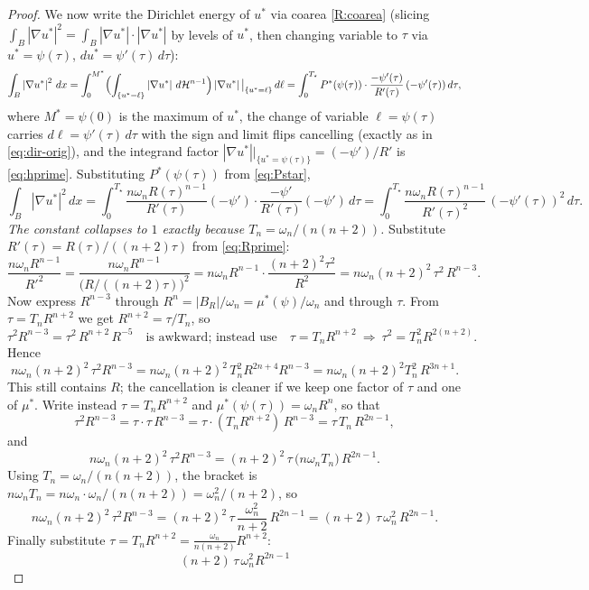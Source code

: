 \documentclass[11pt]{amsart}
\theoremstyle{definition}
\newcommand{\abs}[1]{\left|#1\right|}
\newcommand{\dx}{\,dx}
\newcommand{\dH}{\,d\mathcal H^{n-1}}
\begin{document}
\begin{proof}
We now write the Dirichlet energy of $u^*$ via coarea
\ref{R:coarea} (slicing $\int_B\abs{\nabla u^*}^2=\int_B\abs{\nabla u^*}\cdot
\abs{\nabla u^*}$ by levels of $u^*$, then changing variable to $\tau$ via
$u^*=\psi(\tau)$, $du^*=\psi'(\tau)\,d\tau$):
\[
  \int_B\abs{\nabla u^*}^2\dx
  =\int_0^{M^*}\Bigl(\int_{\{u^*=\ell\}}\abs{\nabla u^*}\dH\Bigr)
     \abs{\nabla u^*}\big|_{\{u^*=\ell\}}\,d\ell
  =\int_0^{T_\star}P^*(\psi(\tau))\cdot\frac{-\psi'(\tau)}{R'(\tau)}
     \,(-\psi'(\tau))\,d\tau,
\]
where $M^*=\psi(0)$ is the maximum of $u^*$, the change of variable
$\ell=\psi(\tau)$ carries $d\ell=\psi'(\tau)\,d\tau$ with the sign and limit
flips cancelling (exactly as in \eqref{eq:dir-orig}), and the integrand
factor $\abs{\nabla u^*}|_{\{u^*=\psi(\tau)\}}=(-\psi')/R'$ is
\eqref{eq:hprime}. Substituting $P^*(\psi(\tau))$ from \eqref{eq:Pstar},
\[
  \int_B\abs{\nabla u^*}^2\dx
  =\int_0^{T_\star}\frac{n\omega_n R(\tau)^{n-1}}{R'(\tau)}(-\psi')
     \cdot\frac{-\psi'}{R'(\tau)}(-\psi')\,d\tau
  =\int_0^{T_\star}\frac{n\omega_n R(\tau)^{n-1}}{R'(\tau)^2}\,
     (-\psi'(\tau))^2\,d\tau .
\]
\emph{The constant collapses to $1$ exactly because $T_n=\omega_n/(n(n+2))$.}
Substitute $R'(\tau)=R(\tau)/((n+2)\tau)$ from \eqref{eq:Rprime}:
\[
  \frac{n\omega_n R^{n-1}}{R'^2}
  =\frac{n\omega_n R^{n-1}}{\bigl(R/((n+2)\tau)\bigr)^2}
  =n\omega_n R^{n-1}\cdot\frac{(n+2)^2\tau^2}{R^2}
  =n\omega_n (n+2)^2\,\tau^2\,R^{n-3}.
\]
Now express $R^{n-3}$ through $R^n=\abs{B_R}/\omega_n=\mu^*(\psi)/\omega_n$
and through $\tau$. From $\tau=T_n R^{n+2}$ we get $R^{n+2}=\tau/T_n$, so
\[
  \tau^2 R^{n-3}=\tau^2\,R^{n+2}\,R^{-5}\quad\text{is awkward; instead use}
  \quad \tau=T_n R^{n+2}\ \Rightarrow\ \tau^2=T_n^2 R^{2(n+2)} .
\]
Hence
\[
  n\omega_n(n+2)^2\,\tau^2 R^{n-3}
  =n\omega_n(n+2)^2\,T_n^2 R^{2n+4}R^{n-3}
  =n\omega_n(n+2)^2 T_n^2\,R^{3n+1}.
\]
This still contains $R$; the cancellation is cleaner if we keep one factor
of $\tau$ and one of $\mu^*$. Write instead
$\tau=T_n R^{n+2}$ and $\mu^*(\psi(\tau))=\omega_n R^n$, so that
\[
  \tau^2 R^{n-3}
  =\tau\cdot\tau\,R^{n-3}
  =\tau\cdot(T_n R^{n+2})\,R^{n-3}
  =\tau\,T_n\,R^{2n-1},
\]
and
\[
  n\omega_n(n+2)^2\,\tau^2R^{n-3}
  =(n+2)^2\,\tau\,\bigl(n\omega_n T_n\bigr)\,R^{2n-1}.
\]
Using $T_n=\omega_n/(n(n+2))$, the bracket is $n\omega_n T_n
=n\omega_n\cdot\omega_n/(n(n+2))=\omega_n^2/(n+2)$, so
\[
  n\omega_n(n+2)^2\,\tau^2R^{n-3}
  =(n+2)^2\,\tau\,\frac{\omega_n^2}{n+2}\,R^{2n-1}
  =(n+2)\,\tau\,\omega_n^2\,R^{2n-1}.
\]
Finally substitute $\tau=T_n R^{n+2}=\tfrac{\omega_n}{n(n+2)}R^{n+2}$:
\[
  (n+2)\,\tau\,\omega_n^2 R^{2n-1}
\]
\end{proof}
\end{document}
